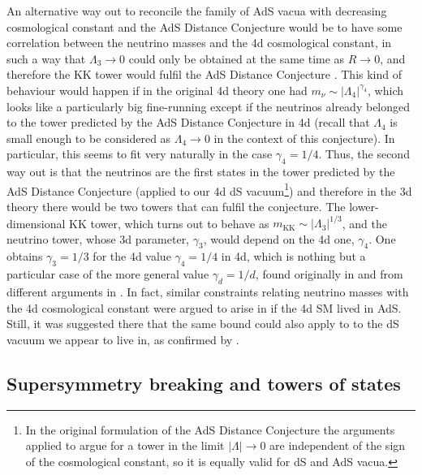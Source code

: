 \documentclass[11pt,a4paper]{article}
\begin{document}
An alternative way out to reconcile the family of AdS vacua with decreasing cosmological constant and the AdS Distance Conjecture would be to have some correlation between the neutrino masses and the 4d cosmological constant, in such a way that $\Lambda_{3}\rightarrow 0$ could only be obtained at the same time as $R\rightarrow 0$, and therefore the KK tower would fulfil the AdS Distance Conjecture \cite{Gonzalo:2021fma,Gonzalo:Toappear,GonzaloStrings}. This kind of behaviour would happen if in the original 4d theory one had $m_{\nu}\sim |\Lambda_4|^{\gamma_4}$, which looks like a particularly big fine-running except if the neutrinos already belonged to the tower predicted by the AdS Distance Conjecture in 4d (recall that $\Lambda_4$ is small enough to be considered as $\Lambda_4 \rightarrow 0$ in the context of this conjecture). In particular, this seems to fit very naturally in the case $\gamma_4=1/4$. Thus, the second way out is that the neutrinos are the first states in the tower predicted by the AdS Distance Conjecture (applied to our 4d dS vacuum\footnote{In the original formulation of the AdS Distance Conjecture the arguments applied to argue for a tower in the limit $|\Lambda| \rightarrow 0$ are independent of the sign of the cosmological constant, so it is equally valid for dS and AdS vacua.}) and therefore in the 3d theory there would be two towers that can fulfil the conjecture. The lower-dimensional KK tower, which turns out to behave as $m_{\mathrm{KK}}\sim |\Lambda_3|^{1/3}$, and the neutrino tower, whose 3d parameter, $\gamma_3$, would depend on the 4d one, $\gamma_4$. One obtains $\gamma_3=1/3$ for the 4d  value  $\gamma_4=1/4$ in 4d, which is nothing but a particular case of the more general value $\gamma_d=1/d$, found originally in \cite{Rudelius:2021oaz} and from different arguments in \cite{Gonzalo:2021fma}.  In fact,  similar constraints relating neutrino masses with the 4d cosmological constant were argued to arise in \cite{Rudelius:2021oaz} if the 4d SM lived in AdS. Still, it was suggested there that the same bound could also apply to to the dS vacuum we appear to live in, as confirmed by \cite{Gonzalo:2021fma,Gonzalo:Toappear,GonzaloStrings}.

\subsection{Supersymmetry breaking and towers of states}
\end{document}
